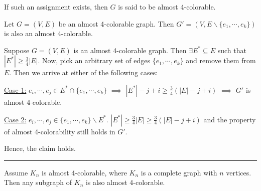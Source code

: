\documentclass[twoside]{article}
\newenvironment{proof}{{\bf Proof.}}{\hfill\rule{2mm}{2mm}}
\begin{document}
\par
If such an assignment exists, then $G$ is said to be almost 4-colorable.

\claim Let $G = (V, E)$ be an almost 4-colorable graph. Then $G' = (V, E \backslash \{ e_1, \cdots, e_k \})$ is also an almost 4-colorable.

\begin{proof}
Suppose $G = (V, E)$ is an almost 4-colorable graph. Then $\exists E^* \subseteq E$ such that $|E^*| \ge \frac{3}{4}|E|$. 
Now, pick an arbitrary set of edges $\{ e_1, \cdots, e_k \}$ and
remove them from $E$. Then we arrive at either of the following cases:

\par
\underline{Case 1:} $e_i, \cdots, e_j \in E^* \cap \{ e_1, \cdots, e_k \}$ $\implies$ 
	$|E^*| - j + i \ge \frac{3}{4}(|E| - j + i)$ $\implies$ $G'$ is almost 4-colorable.

\underline{Case 2:} $e_i, \cdots, e_j \in \{ e_1, \cdots, e_k \} 	\backslash E^*$. 
	$|E^*| \ge \frac{3}{4}|E| \ge \frac{3}{4}(|E| - j + i)$ and the property of almost 4-colorability still holds in $G'$.

Hence, the claim holds.

\end{proof}

\corollary 	Assume $K_n$ is almost 4-colorable, where $K_n$ is a 
	complete graph with $n$ vertices. Then any subgraph of $K_n$
	is also almost 4-colorable.


\end{document}
